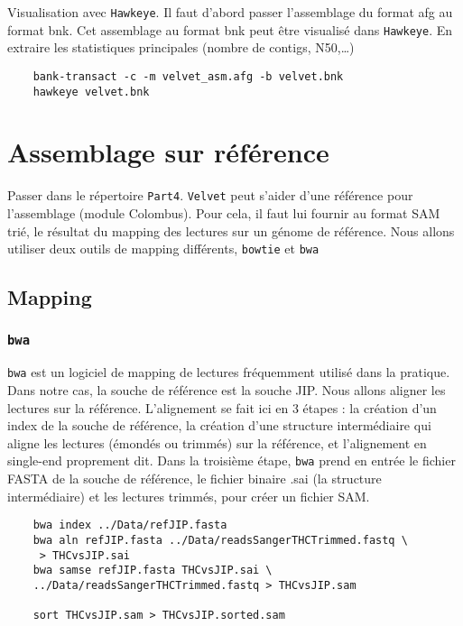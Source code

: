 \documentclass[a4paper,12pt]{article}
\begin{document}
Visualisation avec \verb=Hawkeye=. Il faut d'abord passer l'assemblage du format afg au format bnk. Cet assemblage au format bnk peut être visualisé dans \verb=Hawkeye=. En extraire les statistiques principales (nombre de contigs, N50,\ldots) 
\begin{lstlisting}	
	bank-transact -c -m velvet_asm.afg -b velvet.bnk
	hawkeye velvet.bnk
\end{lstlisting}


\section{Assemblage sur référence}
\label{sec:assr}

Passer dans le répertoire \verb=Part4=. \verb=Velvet= peut s'aider d'une référence pour l'assemblage (module Colombus). Pour cela, il faut lui fournir au format SAM trié, le résultat du mapping des lectures sur un génome de référence. Nous allons utiliser deux outils de mapping différents, \verb=bowtie= et \verb=bwa=

\subsection{Mapping}

\subsubsection{\tt{bwa}}
{\tt bwa} est un logiciel de mapping de lectures fréquemment utilisé dans la pratique. Dans notre cas, la souche de référence est la souche JIP. Nous allons aligner les lectures sur la référence. L'alignement se fait ici en 3 étapes : la création d'un index de la souche de référence, la création d'une structure intermédiaire qui aligne les lectures (émondés ou trimmés) sur la référence, et l'alignement en single-end proprement dit. Dans la troisième étape, {\tt bwa} prend en entrée le fichier FASTA de la souche de référence, le fichier binaire .sai (la structure intermédiaire) et les lectures trimmés, pour créer un fichier SAM.

\begin{lstlisting}
	bwa index ../Data/refJIP.fasta
	bwa aln refJIP.fasta ../Data/readsSangerTHCTrimmed.fastq \
	 > THCvsJIP.sai
	bwa samse refJIP.fasta THCvsJIP.sai \
	../Data/readsSangerTHCTrimmed.fastq > THCvsJIP.sam
	
	sort THCvsJIP.sam > THCvsJIP.sorted.sam
\end{lstlisting}
\end{document}
